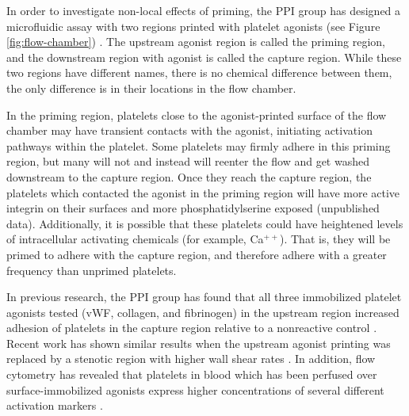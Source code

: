 \documentclass{biophys-new}
\begin{document}
In order to investigate non-local effects of priming, the PPI
group has designed a microfluidic assay with two regions printed with
platelet agonists (see Figure \ref{fig:flow-chamber})
\cite{Corum2012}. The upstream agonist region is called the priming
region, and the downstream region with agonist is called the capture
region. While these two regions have different names, there is no
chemical difference between them, the only difference is in their
locations in the flow chamber.

In the priming region, platelets close to the agonist-printed surface
of the flow chamber may have transient contacts with the agonist,
initiating activation pathways within the platelet. Some platelets may
firmly adhere in this priming region, but many will not and instead
will reenter the flow and get washed downstream to the capture
region. Once they reach the capture region, the platelets which
contacted the agonist in the priming region will have more active
integrin on their surfaces \cite{Corum2012} and more
phosphatidylserine exposed (unpublished data). Additionally, it is
possible that these platelets could have heightened levels of
intracellular activating chemicals (for example, Ca$^{++}$). That is,
they will be primed to adhere with the capture region, and therefore
adhere with a greater frequency than unprimed platelets.

%   

In previous research, the PPI group has found that all three
immobilized platelet agonists tested (vWF, collagen, and fibrinogen)
in the upstream region increased adhesion of platelets in the capture
region relative to a nonreactive control
\cite{Corum2012,Eichinger2016}. Recent work has shown similar results
when the upstream agonist printing was replaced by a stenotic region
with higher wall shear rates \cite{Rahman2020,Rahman2021}. In
addition, flow cytometry has revealed that platelets in blood which
has been perfused over surface-immobilized agonists express higher
concentrations of several different activation markers
\cite{Corum2012,Eichinger2016}.
\end{document}
